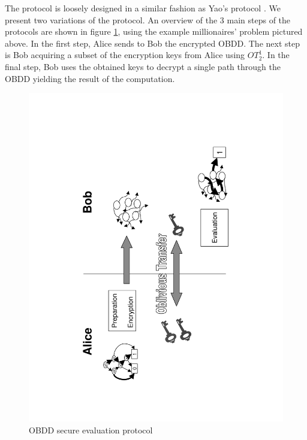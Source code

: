 The protocol is loosely designed in a similar fashion as Yao's protocol
\cite{Yao86}. We present two variations of the protocol. An overview
of the 3 main steps of the protocols are shown in figure \ref{fig:OBDD-overview},
using the example millionaires' problem pictured above. In the first
step, Alice sends to Bob the encrypted OBDD. The next step is Bob
acquiring a subset of the encryption keys from Alice using $OT_{2}^{1}$.
In the final step, Bob uses the obtained keys to decrypt a single
path through the OBDD yielding the result of the computation. 

%
\begin{figure}
\begin{centering}
\includegraphics[scale=0.4,angle=270]{obdd_proto_overview}
\par\end{centering}

\caption{\label{fig:OBDD-overview}OBDD secure evaluation protocol}

\end{figure}


